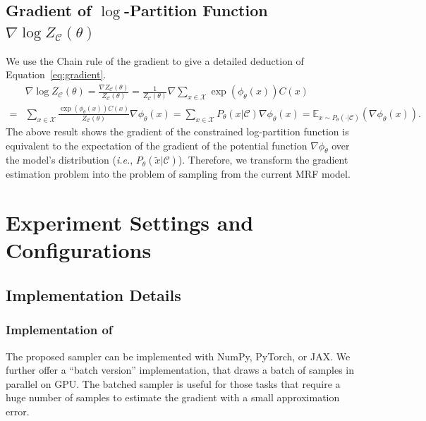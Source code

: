 \subsection{Gradient of $\log$-Partition Function $\nabla\log Z_\mathcal{C}(\theta)$}\label{appendix:partition}
We use the Chain rule of the gradient to give a detailed deduction of Equation~\eqref{eq:gradient}.
\begin{equation}\label{eq:full-gradient}
    \begin{aligned}
          & \nabla\log Z_\mathcal{C}(\theta)=\frac{\nabla Z_\mathcal{C}(\theta)}{Z_\mathcal{C}(\theta)}=\frac{1}{Z_\mathcal{C}(\theta)}\nabla\sum_{x\in \mathcal{X}}\exp\left( \phi_{\theta}(x)\right)C(x) \nonumber                                                                     \\
        = & \sum_{x\in\mathcal{X}} \frac{\exp(\phi_{\theta}(x))C(x) }{Z_\mathcal{C}(\theta)}{\nabla\phi_\theta(x)} =\sum_{x\in \mathcal{X}} P_\theta(x|\mathcal{C}) \nabla\phi_{\theta}(x) = \mathbb{E}_{x\sim P_{\theta}(\cdot|\mathcal{C})} \left({\nabla\phi_{\theta}(x)}\right).
    \end{aligned}
\end{equation}
{The above result shows the gradient of the constrained log-partition function is equivalent to the expectation of the gradient of the potential function $\nabla\phi_{\theta}$ over the model's distribution (\textit{i.e.}, $P_{\theta}(\tilde{x}|\mathcal{C})$). Therefore, we transform the gradient estimation problem into the problem of sampling from the current MRF model.}

\section{Experiment Settings and Configurations}
\label{appendix:exp-set}
\subsection{Implementation Details} \label{appendix:implementation}

\subsubsection*{Implementation of \nls} The proposed sampler can be implemented with NumPy, PyTorch, or JAX. We further
offer a ``batch version'' implementation, that draws a batch of samples in
parallel on GPU. The batched sampler is useful for those tasks that require a
huge number of samples to estimate the gradient with a small approximation
error.

